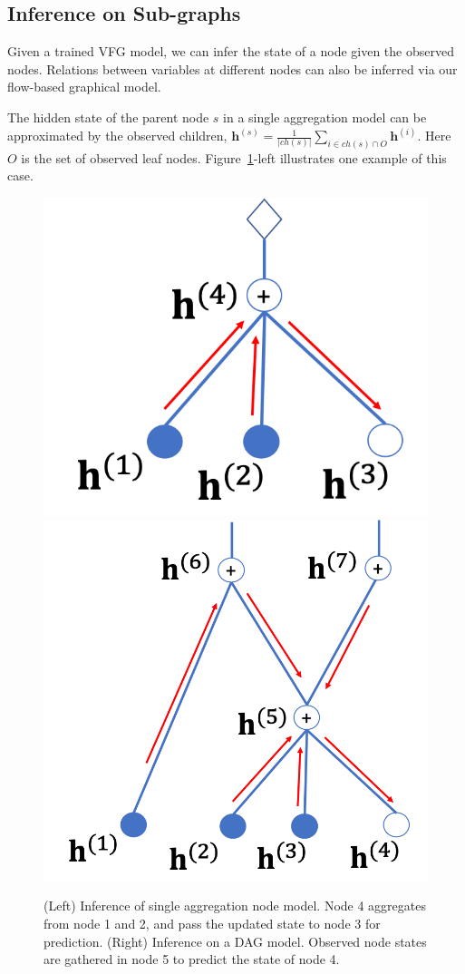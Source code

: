 \documentclass{article} %
\begin{document}
\vspace{-0.05in}
\subsection{Inference on Sub-graphs }
\vspace{-0.05in}

Given a trained VFG model, we can infer the state of a node given the observed nodes. 
Relations between variables at different nodes can also be inferred via our flow-based graphical model. 


The hidden state of the parent node $s$ in a single aggregation model can be approximated by the observed children,
$\mathbf{h}^{(s)}  = \frac{1}{|ch(s)|}\sum_{i \in ch(s) \cap O} \mathbf{h}^{(i)} .$
Here $O$ is the set of observed leaf nodes. Figure~\ref{fig:two_layer_infer}-left illustrates one example of this case. 
\begin{figure}
\vspace{-0.2in}
\begin{center}
 \includegraphics[width=0.4\linewidth]{fig/two_layer_infer.png}
 \hspace{0.15in}
 \includegraphics[width=0.5\linewidth]{fig/dag_infer.png}
\end{center}
\vspace{-0.2in}
 \caption{{\small (Left) Inference of single aggregation node model. Node 4 aggregates from node 1 and 2, and  pass the updated state to node 3 for prediction. (Right) Inference on a DAG model. Observed node states are gathered in node 5 to predict the state of node 4.}}
\label{fig:two_layer_infer}
\vspace{-0.1in}
\end{figure}
\end{document}
